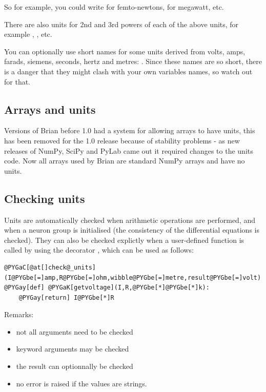 \documentclass[letterpaper,10pt,english]{manual}
\begin{document}
So for example, you could write  for femto-newtons,  for megawatt, etc.

There are also units for 2nd and 3rd powers of each of the above units, for example
, , etc.

You can optionally use short names for some units derived from volts, amps,
farads, siemens, seconds, hertz and metres:
.
Since these names are so short, there is a danger that they might clash with your
own variables names, so watch out for that.


\subsection{Arrays and units}

Versions of Brian before 1.0 had a system for allowing arrays to have units, this has
been removed for the 1.0 release because of stability problems - as new releases of
NumPy, SciPy and PyLab came out it required changes to the units code. Now all arrays
used by Brian are standard NumPy arrays and have no units.


\subsection{Checking units}

Units are automatically checked when arithmetic operations are performed, and when
a neuron group is initialised (the consistency of the differential equations is checked).
They can also be checked explictly when a user-defined function is called by using the
decorator , which can be used as follows:

\begin{Verbatim}[commandchars=@\[\]]
@PYGaC[@at[]check@_units](I@PYGbe[=]amp,R@PYGbe[=]ohm,wibble@PYGbe[=]metre,result@PYGbe[=]volt)
@PYGay[def] @PYGaK[getvoltage](I,R,@PYGbe[*]@PYGbe[*]k):
    @PYGay[return] I@PYGbe[*]R
\end{Verbatim}

Remarks:
\begin{itemize}
\item {} 
not all arguments need to be checked

\item {} 
keyword arguments may be checked

\item {} 
the result can optionnally be checked

\item {} 
no error is raised if the values are strings.

\end{itemize}
\end{document}
